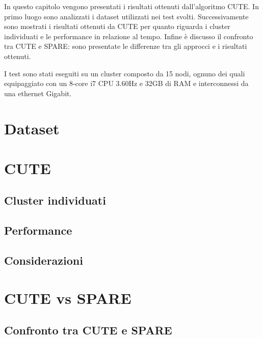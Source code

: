 
In questo capitolo vengono presentati i risultati ottenuti dall'algoritmo CUTE. 
In primo luogo sono analizzati i dataset utilizzati nei test svolti.
Successivamente sono mostrati i risultati ottenuti da CUTE per quanto riguarda i cluster individuati e le performance in relazione al tempo.
Infine è discusso il confronto tra CUTE e SPARE: sono presentate le differenze tra gli approcci e i risultati ottenuti.

I test sono stati eseguiti su un cluster composto da 15 nodi, ognuno dei quali equipaggiato con un 8-core i7 CPU 3.60Hz e 32GB di RAM e interconnessi da una ethernet Gigabit.


\section{Dataset}\label{sec:comp:dataset}


\section{CUTE}\label{sec:comp:cute}


\subsection{Cluster individuati}\label{subsec:comp:cluster}


\subsection{Performance}\label{subsec:comp:performance}


\subsection{Considerazioni}\label{subsec:comp:consideration-and-limits}


\section{CUTE vs SPARE}\label{sec:CUTEvsSPARE}


\subsection{Confronto tra CUTE e SPARE}\label{subsec:comp:CUTEvsSPARE}


